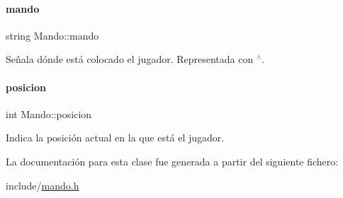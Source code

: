 \hypertarget{classMando_a156e71bce6ea523dccbce03021bee4dd}{}\label{classMando_a156e71bce6ea523dccbce03021bee4dd} 
\paragraph{\texorpdfstring{mando}{mando}}
{\footnotesize\ttfamily string Mando\+::mando\hspace{0.3cm}{\ttfamily [private]}}



Señala dónde está colocado el jugador. Representada con \textquotesingle{}$^\wedge$\textquotesingle{}. 

\hypertarget{classMando_a7971a6eaa8b936977be7460ffa28530f}{}\label{classMando_a7971a6eaa8b936977be7460ffa28530f} 
\paragraph{\texorpdfstring{posicion}{posicion}}
{\footnotesize\ttfamily int Mando\+::posicion\hspace{0.3cm}{\ttfamily [private]}}



Indica la posición actual en la que está el jugador. 



La documentación para esta clase fue generada a partir del siguiente fichero\+:\begin{DoxyCompactItemize}
\item 
include/\hyperlink{mando_8h}{mando.\+h}\end{DoxyCompactItemize}

